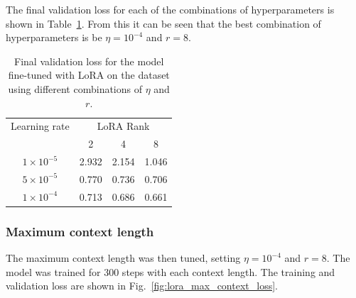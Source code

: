 \documentclass[11pt,a4paper]{article}
\begin{document}
The final validation loss for each of the combinations of hyperparameters is shown in Table~\ref{tab:lora_lr_rank}. From this it can be seen that the best combination of hyperparameters is be $\eta = 10^{-4}$ and $r=8$.

\begin{table}
    \centering
    \begin{tabular}{c|c|c|c}
        Learning rate & \multicolumn{3}{|c}{LoRA Rank} \\
        & 2 & 4 & 8 \\
        \hline
        $1 \times 10^{-5}$ & 2.932 & 2.154 & 1.046 \\
        $5 \times 10^{-5}$ & 0.770 & 0.736 & 0.706 \\
        $1 \times 10^{-4}$ & 0.713 & 0.686 & 0.661 \\
    \end{tabular}
    \caption{Final validation loss for the model fine-tuned with LoRA on the dataset using different combinations of $\eta$ and $r$.}
    \label{tab:lora_lr_rank}
\end{table}
\clearpage
\subsubsection{Maximum context length}
\label{sec:max_ctx}
The maximum context length was then tuned, setting $\eta = 10^{-4}$ and $r=8$. The model was trained for 300 steps with each context length. The training and validation loss are shown in Fig.~\ref{fig:lora_max_context_loss}. 
\end{document}

